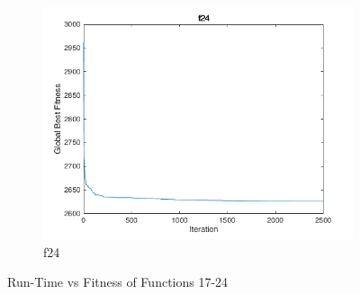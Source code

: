 \begin{figure}
\begin{subfigure}[b]{0.4\textwidth}
    \includegraphics[width=\textwidth]{img/cecrt/f24}
    \caption{f24}
  \end{subfigure}
  \caption{Run-Time vs Fitness of Functions 17-24}
\end{figure}

\clearpage

